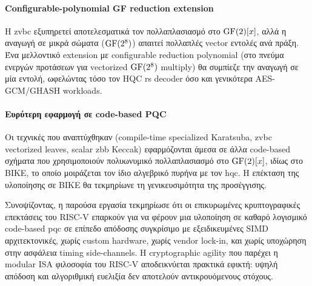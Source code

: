 \paragraph{Configurable-polynomial GF reduction extension}
Η \gls{zvbc}  εξυπηρετεί αποτελεσματικά τον πολλαπλασιασμό στο
$\mathrm{GF}(2)[x]$, αλλά η αναγωγή σε μικρά σώματα (\eg $\mathrm{GF}(2^8)$) απαιτεί
πολλαπλές vector εντολές ανά πράξη. Ένα μελλοντικό extension με
configurable reduction polynomial (στο πνεύμα ενεργών προτάσεων για vectorized $\mathrm{GF}(2^8)$ multiply) θα
συμπίεζε την αναγωγή σε μία εντολή, ωφελώντας τόσο τον HQC \gls{rs}
decoder όσο και γενικότερα AES-GCM/GHASH workloads.

\paragraph{Ευρύτερη εφαρμογή σε code-based PQC}
Οι τεχνικές που αναπτύχθηκαν (compile-time specialized Karatsuba, \gls{zvbc} vectorized leaves, scalar
\gls{zbb} Keccak) εφαρμόζονται άμεσα σε άλλα code-based σχήματα που
χρησιμοποιούν πολυωνυμικό πολλαπλασιασμό στο $\mathrm{GF}(2)[x]$, ιδίως στο BIKE, το
οποίο μοιράζεται τον ίδιο αλγεβρικό πυρήνα με τον \gls{hqc}. Η επέκταση της
υλοποίησης σε BIKE θα τεκμηρίωνε τη γενικευσιμότητα της προσέγγισης.


\vspace{1em}
Συνοψίζοντας, η παρούσα εργασία τεκμηρίωσε ότι οι επικυρωμένες κρυπτογραφικές
επεκτάσεις του RISC-V επαρκούν για να φέρουν μια υλοποίηση σε καθαρό λογισμικό
code-based \gls{pqc} σε επίπεδο απόδοσης συγκρίσιμο με εξειδικευμένες SIMD
αρχιτεκτονικές, χωρίς custom hardware, χωρίς vendor lock-in\ifTODO, και χωρίς
υποχώρηση στην ασφάλεια timing side-channels\fi. Η cryptographic agility που
παρέχει η modular ISA φιλοσοφία του RISC-V αποδεικνύεται πρακτικά εφικτή:
υψηλή απόδοση και αλγοριθμική ευελιξία δεν αποτελούν αντικρουόμενους στόχους.
